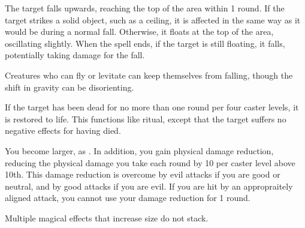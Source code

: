\begin{spellheader}
\end{spellheader}
\begin{spelleffects}
    \spelleffect The target falls upwards, reaching the top of the area within 1 round. If the target strikes a solid object, such as a ceiling, it is affected in the same way as it would be during a normal fall. Otherwise, it floats at the top of the area, oscillating slightly. When the spell ends, if the target is still floating, it falls, potentially taking damage for the fall.
\end{spelleffects}
\begin{spellfooter}
    \spellnotes Creatures who can fly or levitate can keep themselves from falling, though the shift in gravity can be disorienting.
\end{spellfooter}

\begin{spellheader}
\end{spellheader}
\begin{spelleffects}
    \spelleffect If the target has been dead for no more than one round per four caster levels, it is restored to life. This functions like  ritual, except that the target suffers no negative effects for having died.
    \spellline
\end{spelleffects}
\begin{spellfooter}

\end{spellfooter}

\begin{spellheader}
    \spelldur{\durshort \dismissable}
\end{spellheader}
\begin{spelleffects}
    \spellsuccess You become larger, as . In addition, you gain physical damage reduction, reducing the physical damage you take each round by 10  per caster level above 10th. This damage reduction is overcome by evil attacks if you are good or neutral, and by good attacks if you are evil. If you are hit by an appropraitely aligned attack, you cannot use your damage reduction for 1 round.
\end{spelleffects}
\begin{spellfooter}
    \spellnotes Multiple magical effects that increase size do not stack.
\end{spellfooter}

